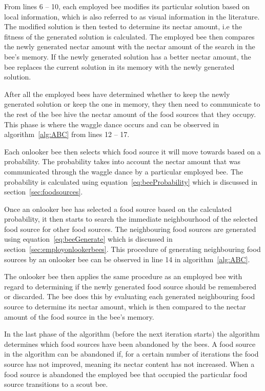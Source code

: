 From lines 6 -- 10, each employed bee modifies its particular solution based on local information, which is also referred to as visual information in the literature. The modified solution is then tested to determine its nectar amount, i.e the fitness of the generated solution is calculated. The employed bee then compares the newly generated nectar amount with the nectar amount of the search in the bee's memory. If the newly generated solution has a better nectar amount, the bee replaces the current solution in its memory with the newly generated solution.

After all the employed bees have determined whether to keep the newly generated solution or keep the one in memory, they then need to communicate to the rest of the bee hive the nectar amount of the food sources that they occupy. This phase is where the waggle dance occurs and can be observed in algorithm~\ref{alg:ABC} from lines 12 -- 17.

Each onlooker bee then selects which food source it will move towards based on a probability. The probability takes into account the nectar amount that was communicated through the waggle dance by a particular employed bee. The probability is calculated using equation~\ref{eq:beeProbability} which is discussed in section~\ref{sec:foodsources}.

Once an onlooker bee has selected a food source based on the calculated probability, it then starts to search the immediate neighbourhood of the selected food source for other food sources. The neighbouring food sources are generated using equation~\ref{eq:beeGenerate} which is discussed in section~\ref{sec:employonlookerbees}. This procedure of generating neighbouring food sources by an onlooker bee can be observed in line 14 in algorithm~\ref{alg:ABC}.

The onlooker bee then applies the same procedure as an employed bee with regard to determining if the newly generated food source should be remembered or discarded. The bee does this by evaluating each generated neighbouring food source to determine its nectar amount, which is then compared to the nectar amount of the food source in the bee's memory.

In the last phase of the algorithm (before the next iteration starts) the algorithm determines which food sources have been abandoned by the bees. A food source in the algorithm can be abandoned if, for a certain number of iterations the food source has not improved, meaning its nectar content has not increased. When a food source is abandoned the employed bee that occupied the particular food source transitions to a scout bee.

